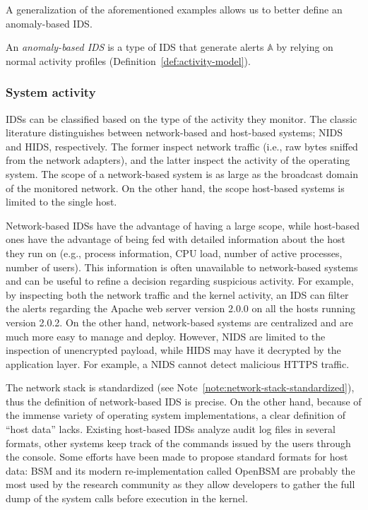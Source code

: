 \medskip

A generalization of the aforementioned examples allows us to better
define an anomaly-based \ac{IDS}.

\begin{definition}
  An \emph{anomaly-based \ac{IDS}} is a type of \ac{IDS} that generate
  alerts $\mathbb{A}$ by relying on normal activity profiles
  (Definition~\ref{def:activity-model}).
\end{definition}

\subsubsection{System activity} \acp{IDS} can be classified
based on the type of the activity they monitor. The classic literature
distinguishes between network\hyp{}based and host\hyp{}based systems;
\ac{NIDS} and \ac{HIDS}, respectively. The former inspect network
traffic (i.e., raw bytes sniffed from the network adapters), and the
latter inspect the activity of the operating system. The scope of a
network-based system is as large as the broadcast domain of the
monitored network. On the other hand, the scope host-based systems is
limited to the single host.

Network-based \acp{IDS} have the advantage of having a
large scope, while host-based ones have the advantage of being fed
with detailed information about the host they run on (e.g., process
information, \ac{CPU} load, number of active processes,
number of users). This information is often unavailable to
network-based systems and can be useful to refine a decision regarding
suspicious activity. For example, by inspecting both the network
traffic and the kernel activity, an \ac{IDS} can filter the alerts
regarding the \textsf{Apache} web server version 2.0.0 on all the
hosts running version 2.0.2. On the other hand, network-based systems
are centralized and are much more easy to manage and deploy. However,
\ac{NIDS} are limited to the inspection of unencrypted payload, while
\ac{HIDS} may have it decrypted by the application layer. For example,
a \ac{NIDS} cannot detect malicious HTTPS traffic.

The network stack is standardized (see
Note~\ref{note:network-stack-standardized}), thus the definition of
network-based \ac{IDS} is precise. On the other hand, because of the
immense variety of operating system implementations, a clear
definition of ``host data'' lacks. Existing host-based
\acp{IDS} analyze audit log files in several formats, other
systems keep track of the commands issued by the users through the
console. Some efforts have been made to propose standard formats for
host data: \ac{BSM} and its modern re-implementation called
\textsf{OpenBSM} \citep{openbsm,openbsm_site} are probably the most
used by the research community as they allow developers to gather the
full dump of the system calls before execution in the kernel.

